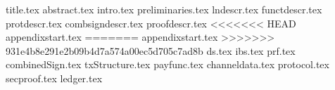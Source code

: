 \documentclass{llncs}
\begin{document}
\pagestyle{plain}
{title.tex}
{abstract.tex}
{intro.tex}
{preliminaries.tex}
{lndescr.tex}
{functdescr.tex}
{protdescr.tex}
{combsigndescr.tex}
{proofdescr.tex}
<<<<<<< HEAD
{appendixstart.tex}   
=======
{appendixstart.tex}
>>>>>>> 931e4b8e291e2b09b4d7a574a00ec5d705c7ad8b
{ds.tex}
{ibs.tex}
{prf.tex}
{combinedSign.tex}
{txStructure.tex}
{payfunc.tex}
{channeldata.tex}
{protocol.tex}
{secproof.tex}
{ledger.tex}


\end{document}
